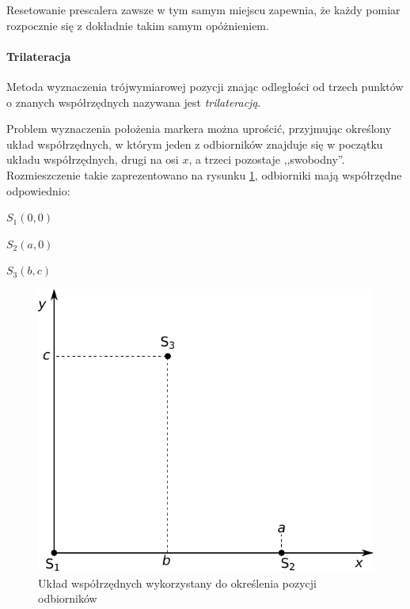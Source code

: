 Resetowanie prescalera zawsze w tym samym miejscu zapewnia, że każdy pomiar rozpocznie się z dokładnie takim samym opóżnieniem.

\paragraph{Trilateracja}
\label{par:trilateration}
Metoda wyznaczenia trójwymiarowej pozycji znając odległości od trzech punktów o znanych współrzędnych nazywana jest \textit{trilateracją}.%

Problem wyznaczenia położenia markera można uprościć, przyjmując określony układ współrzędnych, w którym jeden z odbiorników znajduje się w początku układu współrzędnych, drugi na osi $x$, a trzeci pozostaje ,,swobodny''. Rozmieszczenie takie zaprezentowano na rysunku \ref{fig:schema_coordinates}, odbiorniki mają współrzędne odpowiednio:
\begin{center}
 $S_1 (0, 0)$

 $S_2 (a, 0)$

 $S_3 (b, c)$
\end{center}

\begin{figure}
  \includegraphics[width=\textwidth]{gfx/diagramy/schemat_uklad_wspolrzednych_clipped}
  \caption{Układ współrzędnych wykorzystany do określenia pozycji odbiorników}
  \label{fig:schema_coordinates}
\end{figure}

